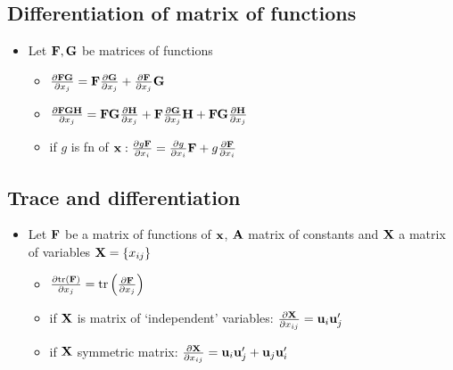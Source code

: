 \documentclass[a4paper, oneside]{book}
\begin{document}
\subsection*{Differentiation of matrix of functions}
\begin{itemize}
\item Let $\mathbf{F, G}$ be matrices of functions
\begin{itemize}
\item $\frac{\partial \mathbf{FG}}{\partial x_j} = \mathbf{F}\frac{\partial \mathbf{G}}{\partial x_j}+\frac{\partial \mathbf{F}}{\partial x_j}\mathbf{G}$
\item $\frac{\partial \mathbf{FGH}}{\partial x_j} = \mathbf{FG}\frac{\partial \mathbf{H}}{\partial x_j}+\mathbf{F}\frac{\partial \mathbf{G}}{\partial x_j}\mathbf{H}+\mathbf{FG}\frac{\partial \mathbf{H}}{\partial x_j}$
\item if $g$ is fn of $\mathbf{x}: \frac{\partial g\mathbf{F}}{\partial x_i} = \frac{\partial g}{\partial x_i}\mathbf{F}+g\frac{\partial \mathbf{F}}{\partial x_i}$
\end{itemize}
\end{itemize}
%
%
\subsection*{Trace and differentiation}
\begin{itemize}
\item Let $\mathbf{F}$ be a matrix of functions of $\mathbf{x}$, $\mathbf{A}$ matrix of constants and $\mathbf{X}$ a matrix of variables $\mathbf{X}=\{x_{ij}\}$ 
	\begin{itemize}
	\item  $\frac{\partial \text{tr}(\mathbf{F})}{\partial x_j} = \text{tr}\left(\frac{\partial \mathbf{F}}{\partial x_j}\right)$ 
	\item if $\mathbf{X}$ is matrix of `independent' variables: $\frac{\partial \mathbf{X}}{\partial x_{ij}} = 	\mathbf{u}_i\mathbf{u}_j'$
	\item if $\mathbf{X}$ symmetric matrix: $\frac{\partial \mathbf{X}}{\partial x_{ij}} = \mathbf{u}_i\mathbf{u}_j'+\mathbf{u}_j	\mathbf{u}_i'$	
	\end{itemize}
\end{itemize}
\end{document}
